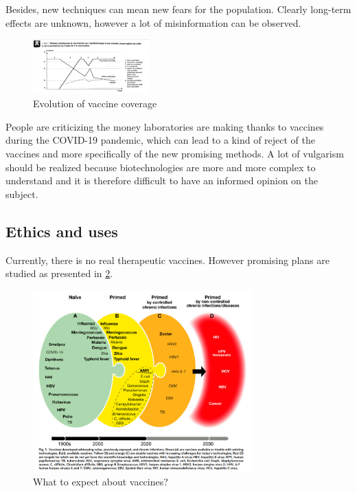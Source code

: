 \documentclass{article}
\begin{document}
            
            Besides, new techniques can mean new fears for the population.
                Clearly long-term effects are unknown, however a lot of misinformation can be observed.

                
        
        \begin{figure}
                \centering
            \includegraphics[width=0.4\textwidth, angle=90]{imgs/Perception.jpg} %
                \caption{Evolution of vaccine coverage \autocite{PILLYEtudiantMaladies}}
            \label{fig:perception}
        \end{figure}


            People are criticizing the money laboratories are making thanks to vaccines during the COVID-19 pandemic, 
                which can lead to a kind of reject of the vaccines and more specifically of the new promising methods.
            A lot of vulgarism should be realized because biotechnologies are more and more complex to understand
                and it is therefore difficult to have an informed opinion on the subject.








        \subsection{Ethics and uses}
        
        Currently, there is no real therapeutic vaccines. However promising plans are studied as presented in \ref{fig:vaccEvolution}.

        \begin{figure}
            \centering
            \includegraphics[width=0.75\textwidth]{imgs/vaccineEvolution.PNG}
            \caption{What to expect about vaccines? \autocite{rappuoliVaccinologyPostCOVID192021}}
            \label{fig:vaccEvolution}
        \end{figure}
\end{document}
